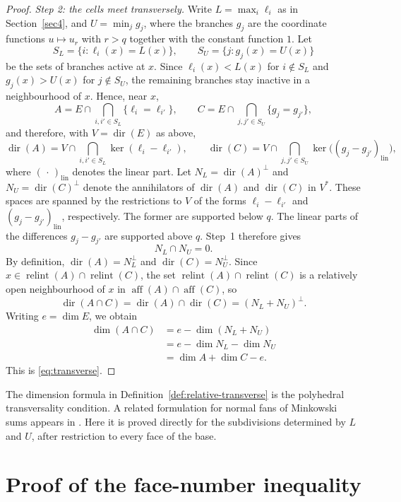\documentclass[a4paper,12pt]{amsart}
\theoremstyle{definition}
\theoremstyle{remark}
\newcommand{\relint}{\operatorname{relint}}
\newcommand{\dir}{\operatorname{dir}}
\begin{document}
\begin{proof}
\smallskip
\noindent\emph{Step 2: the cells meet transversely.}
Write $L=\max_i\ell_i$ as in Section~\ref{sec4}, and $U=\min_j g_j$, where the branches $g_j$ are the coordinate functions $u\mapsto u_r$ with $r>q$ together with the constant function $1$.
Let
\[
 S_L=\{i:\ell_i(x)=L(x)\},  \qquad  S_U=\{j:g_j(x)=U(x)\}
\]
be the sets of branches active at $x$.
Since $\ell_i(x)<L(x)$ for $i\notin S_L$ and $g_j(x)>U(x)$ for $j\notin S_U$, the remaining branches stay inactive in a neighbourhood of $x$.
Hence, near $x$,
\[
 A=E\cap\bigcap_{i,i'\in S_L}\{\ell_i=\ell_{i'}\},  \qquad  C=E\cap\bigcap_{j,j'\in S_U}\{g_j=g_{j'}\},
\]
and therefore, with $V=\dir(E)$ as above,
\[
 \dir(A)=V\cap\bigcap_{i,i'\in S_L}\ker(\ell_i-\ell_{i'}),  \qquad  \dir(C)=V\cap\bigcap_{j,j'\in S_U}\ker\bigl((g_j-g_{j'})_{\mathrm{lin}}\bigr),
\]
where $(\,\cdot\,)_{\mathrm{lin}}$ denotes the linear part.
Let $N_L=\dir(A)^\perp$ and $N_U=\dir(C)^\perp$ denote the annihilators of $\dir(A)$ and $\dir(C)$ in $V^*$.
These spaces are spanned by the restrictions to $V$ of the forms $\ell_i-\ell_{i'}$ and $(g_j-g_{j'})_{\mathrm{lin}}$, respectively.
The former are supported below $q$.
The linear parts of the differences $g_j-g_{j'}$ are supported above $q$.
Step~1 therefore gives
\[
 N_L\cap N_U=0.
\]
By definition, $\dir(A)=N_L^\perp$ and $\dir(C)=N_U^\perp$.
Since $x\in\relint(A)\cap\relint(C)$, the set $\relint(A)\cap\relint(C)$ is a relatively open neighbourhood of $x$ in $\operatorname{aff}(A)\cap\operatorname{aff}(C)$, so
\[
 \dir(A\cap C)=\dir(A)\cap\dir(C)=(N_L+N_U)^\perp.
\]
Writing $e=\dim E$, we obtain
\begin{align*}
 \dim(A\cap C)  &=e-\dim(N_L+N_U)\\
 &=e-\dim N_L-\dim N_U\\
 &=\dim A+\dim C-e.
\end{align*}
This is \eqref{eq:transverse}.
\end{proof}

The dimension formula in Definition~\ref{def:relative-transverse} is the polyhedral transversality condition.
A related formulation for normal fans of Minkowski sums appears in \cite[Sections~2--3]{FW10}.
Here it is proved directly for the subdivisions determined by $L$ and $U$,  after restriction to every face of the base.

\section{Proof of the face-number inequality}\label{sec6}
\end{document}

